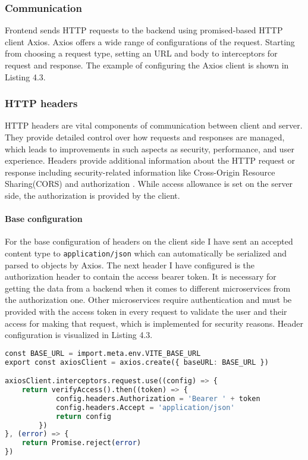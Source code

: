 \subsubsection{Communication } Frontend sends HTTP requests \cite{http-request} to the backend using promised-based HTTP client Axios. Axios offers a wide range of configurations of the request. Starting from choosing a request type, setting an URL and body to interceptors for request and response. The example of configuring the Axios client is shown in Listing 4.3.

\subsubsection{HTTP headers} HTTP headers are vital components of communication between client and server. They provide detailed control over how requests and responses are managed, which leads to improvements in such aspects as security, performance, and user experience. Headers provide additional information about the HTTP request or response including security-related information like Cross-Origin Resource Sharing(CORS) \cite{http-cors} and authorization \cite{http-auth}. While access allowance is set on the server side, the authorization is provided by the client. 

\paragraph*{Base configuration} For the base configuration of headers on the client side I have sent an accepted content type to \texttt{application/json} which can automatically be serialized and parsed to objects by Axios. The next header I have configured is the authorization header to contain the access bearer token. It is necessary for getting the data from a backend when it comes to different microservices from the authorization one. Other microservices require authentication and must be provided with the access token in every request to validate the user and their access for making that request, which is implemented for security reasons. Header configuration is visualized in Listing 4.3.

\begin{lstlisting}[language=Octave, caption=Base Axios configuration]
const BASE_URL = import.meta.env.VITE_BASE_URL
export const axiosClient = axios.create({ baseURL: BASE_URL })

axiosClient.interceptors.request.use((config) => {
    return verifyAccess().then((token) => {
            config.headers.Authorization = 'Bearer ' + token
            config.headers.Accept = 'application/json'
            return config
        })
}, (error) => {
    return Promise.reject(error)
})
\end{lstlisting}
